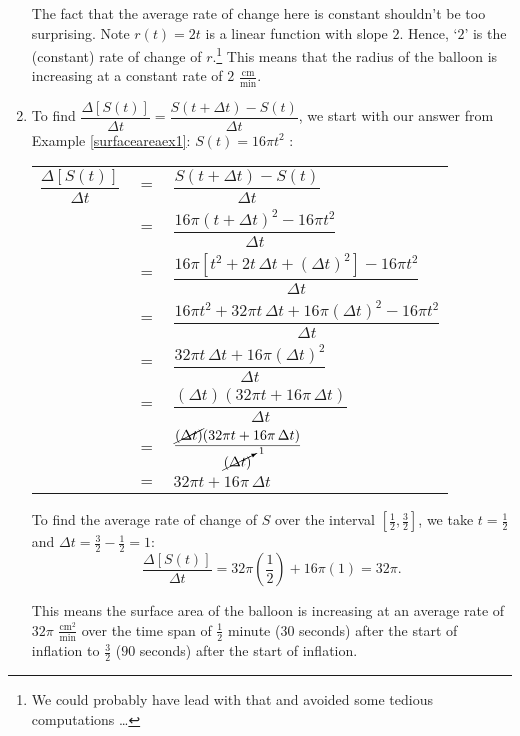 \documentclass{ximera}
\begin{document}
\begin{ex}
\begin{enumerate}
The fact that the average rate of change here is constant shouldn't be too surprising.  Note $r(t) = 2t$ is a linear function with slope $2$.  Hence, `$2$' is the (constant) rate of change of $r$.\footnote{We could probably have lead with that and avoided some tedious computations \ldots}  This means that the radius of the balloon is increasing at a constant rate of $2$ $\frac{\text{cm}}{\text{min}}$.


                         
\item  To find  $\dfrac{\Delta[S(t)]}{\Delta t} = \dfrac{S(t+ \Delta t) - S(t)}{\Delta t}$, we start with our answer from Example \ref{surfaceareaex1}:  $S(t) =  16 \pi t^{2}$ :

\begin{longtable}{rcl}

 $\dfrac{\Delta[S(t)]}{\Delta t}$ & $=$ &$\dfrac{S(t+ \Delta t) - S(t)}{\Delta t}$   \\[10pt]
                         & $=$ & $\dfrac{16 \pi (t+ \Delta t)^2 - 16 \pi t^2}{\Delta t}$ \\[10pt]
                         & $=$ & $\dfrac{16 \pi \left[ t^2 + 2 t \, \Delta t + (\Delta t)^2\right]  - 16 \pi t^2}{\Delta t}$ \\[10pt]
                         & $=$ & $\dfrac{16 \pi t^2 + 32 \pi t \, \Delta t + 16 \pi (\Delta t)^2   - 16 \pi t^2}{\Delta t}$ \\[10pt]
                         & $=$ & $\dfrac{32 \pi t \, \Delta t + 16 \pi (\Delta t)^2}{\Delta t}$ \\[10pt]
                         & $=$ & $\dfrac{(\Delta t) (32 \pi t + 16 \pi \, \Delta t)}{\Delta t}$ \\[10pt]
                         & $=$ & $\dfrac{\cancel{(\Delta t)} (32 \pi t + 16 \pi \, \Delta t)}{\cancelto{1}{(\Delta t)}}$ \\[10pt]
                         & $=$ & $32 \pi t + 16 \pi \, \Delta t$  \\ \end{longtable}
                         
To find the average rate of change of $S$ over the interval $\left[\frac{1}{2}, \frac{3}{2}\right]$, we take $t = \frac{1}{2}$ and $\Delta t = \frac{3}{2} - \frac{1}{2} = 1$: \[\frac{\Delta[S(t)]}{\Delta t} = 32 \pi \left(\frac{1}{2}\right) + 16 \pi (1) = 32 \pi.\]

\medskip

This means the surface area of the balloon  is increasing at an average rate of $32 \pi$ $\frac{\text{cm}^2}{\text{min}}$ over the time span of $\frac{1}{2}$ minute ($30$ seconds) after the start of inflation to $\frac{3}{2}$ ($90$ seconds) after the start of inflation.


\end{enumerate}
\end{ex}
\end{document}
